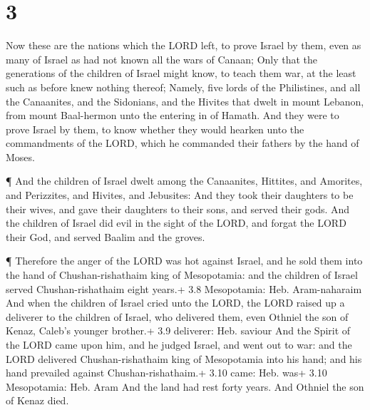 \hypertarget{section-2}{%
\section{3}\label{section-2}}

 Now these are the nations which the LORD left, to prove
Israel by them, even as many of Israel as had not known all the wars of
Canaan;  Only that the generations of the children of Israel
might know, to teach them war, at the least such as before knew nothing
thereof;  Namely, five lords of the Philistines, and all the
Canaanites, and the Sidonians, and the Hivites that dwelt in mount
Lebanon, from mount Baal-hermon unto the entering in of Hamath.
 And they were to prove Israel by them, to know whether they
would hearken unto the commandments of the LORD, which he commanded
their fathers by the hand of Moses.

 ¶ And the children of Israel dwelt among the Canaanites,
Hittites, and Amorites, and Perizzites, and Hivites, and Jebusites:
 And they took their daughters to be their wives, and gave
their daughters to their sons, and served their gods.  And
the children of Israel did evil in the sight of the LORD, and forgat the
LORD their God, and served Baalim and the groves.

 ¶ Therefore the anger of the LORD was hot against Israel,
and he sold them into the hand of Chushan-rishathaim king of
Mesopotamia: and the children of Israel served Chushan-rishathaim eight
years.+ 3.8 Mesopotamia: Heb. Aram-naharaim  And when the
children of Israel cried unto the LORD, the LORD raised up a deliverer
to the children of Israel, who delivered them, even Othniel the son of
Kenaz, Caleb's younger brother.+ 3.9 deliverer: Heb. saviour
 And the Spirit of the LORD came upon him, and he judged
Israel, and went out to war: and the LORD delivered Chushan-rishathaim
king of Mesopotamia into his hand; and his hand prevailed against
Chushan-rishathaim.+ 3.10 came: Heb. was+ 3.10 Mesopotamia: Heb. Aram
 And the land had rest forty years. And Othniel the son of
Kenaz died.

